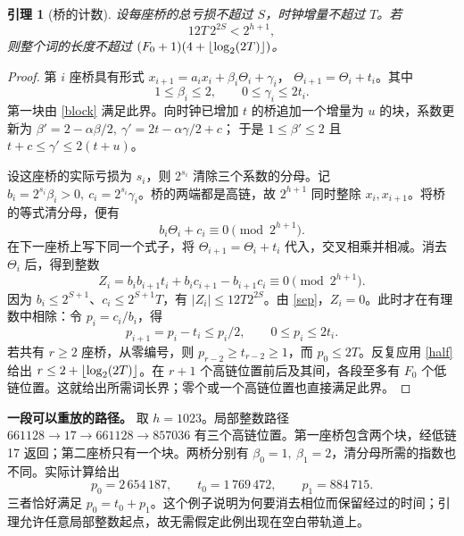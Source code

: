 \documentclass[UTF8,12pt,a4paper,fontset=fandol,scheme=plain]{ctexart}
\theoremstyle{cn}\newtheorem{thm}{定理}\newtheorem{lem}[thm]{引理}
\begin{document}
\begin{lem}[桥的计数]\label{bridge}
设每座桥的总亏损不超过 \(S\)，时钟增量不超过 \(T\)。若
\begin{equation}             12T\,2^{2S}<2^{h+1},                 \label{sep}\end{equation}
则整个词的长度不超过 \((F_0+1)(4+\lfloor\log_2(2T)\rfloor)\)。
\end{lem}
\begin{proof}
第 \(i\) 座桥具有形式 \(x_{i+1}=a_i x_i+\beta_i\Theta_i+\gamma_i\)，
\(\Theta_{i+1}=\Theta_i+t_i\)。其中
\[
     1\le\beta_i\le2,\qquad 0\le\gamma_i\le2t_i .
\]
第一块由 \eqref{block} 满足此界。向时钟已增加 \(t\) 的桥追加一个增量为 \(u\) 的块，系数更新为
\(\beta'=2-\alpha\beta/2,\ \gamma'=2t-\alpha\gamma/2+c\)；
于是 \(1\le\beta'\le2\) 且 \(t+c\le\gamma'\le2(t+u)\)。

设这座桥的实际亏损为 \(s_i\)，则 \(2^{s_i}\) 清除三个系数的分母。记
\(b_i=2^{s_i}\beta_i>0,\ c_i=2^{s_i}\gamma_i\)。桥的两端都是高链，故 \(2^{h+1}\) 同时整除 \(x_i,x_{i+1}\)。将桥的等式清分母，便有
\[
                 b_i\Theta_i+c_i\equiv0\pmod {2^{h+1}} .
\]
在下一座桥上写下同一个式子，将 \(\Theta_{i+1}=\Theta_i+t_i\) 代入，交叉相乘并相减。消去 \(\Theta_i\) 后，得到整数
\[
          Z_i=b_i b_{i+1}t_i+b_i c_{i+1}-b_{i+1}c_i
          \equiv0\pmod {2^{h+1}} .
\]
因为 \(b_i\le2^{S+1}\)、\(c_i\le2^{S+1}T\)，有 \(|Z_i|\le12T2^{2S}\)。由 \eqref{sep}，\(Z_i=0\)。此时才在有理数中相除：令 \(p_i=c_i/b_i\)，得
\begin{equation}
              p_{i+1}=p_i-t_i\le p_i/2,\qquad 0\le p_i\le2t_i . \label{half}
\end{equation}
若共有 \(r\ge2\) 座桥，从零编号，则 \(p_{r-2}\ge t_{r-2}\ge1\)，而 \(p_0\le2T\)。反复应用 \eqref{half} 给出 \(r\le2+\lfloor\log_2(2T)\rfloor\)。在 \(r+1\) 个高链位置前后及其间，各段至多有 \(F_0\) 个低链位置。这就给出所需词长界；零个或一个高链位置也直接满足此界。
\end{proof}

\noindent\textbf{一段可以重放的路径。}
取 \(h=1023\)。局部整数路径 \(661128\to17\to661128\to857036\) 有三个高链位置。第一座桥包含两个块，经低链 17 返回；第二座桥只有一个块。两桥分别有 \(\beta_0=1,\ \beta_1=2\)，清分母所需的指数也不同。实际计算给出
\[
          p_0=2\,654\,187,\qquad t_0=1\,769\,472,\qquad p_1=884\,715 .
\]
三者恰好满足 \(p_0=t_0+p_1\)。这个例子说明为何要消去相位而保留经过的时间；引理允许任意局部整数起点，故无需假定此例出现在空白带轨道上。

\newpage
\end{document}
